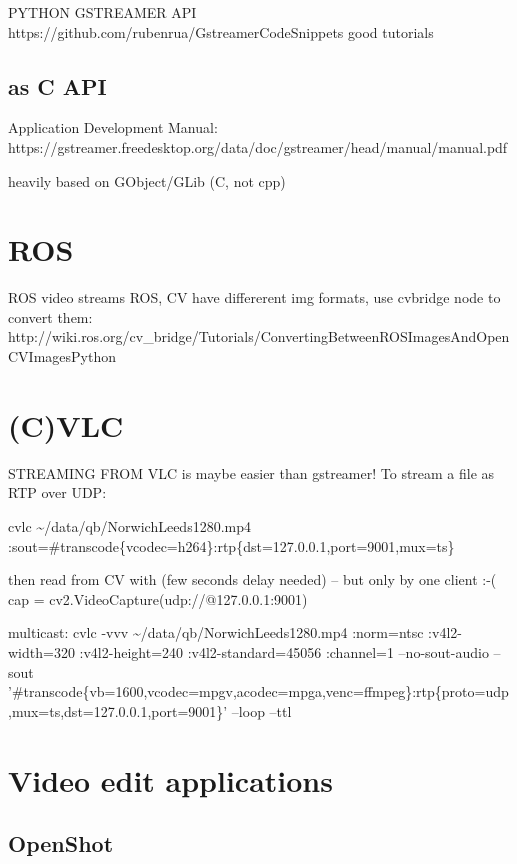 \documentclass[oneside,english]{scrbook}
\begin{document}
PYTHON GSTREAMER API https://github.com/rubenrua/GstreamerCodeSnippets
good tutorials

\section{as C API}
Application Development Manual:  https://gstreamer.freedesktop.org/data/doc/gstreamer/head/manual/manual.pdf

heavily based on GObject/GLib (C, not cpp)



\chapter{ROS}

ROS video streams ROS, CV have differerent img formats, use cvbridge
node to convert them: http://wiki.ros.org/cv\_bridge/Tutorials/ConvertingBetweenROSImagesAndOpenCVImagesPython


\chapter{(C)VLC}

STREAMING FROM VLC is maybe easier than gstreamer! To stream a file
as RTP over UDP:

cvlc \textasciitilde{}/data/qb/NorwichLeeds1280.mp4 :sout=\#transcode\{vcodec=h264\}:\textquotedbl{}rtp\{dst=127.0.0.1,port=9001,mux=ts\}\textquotedbl{}

then read from CV with (few seconds delay needed) -- but only by one
client :-( cap = cv2.VideoCapture(\textquotedbl{}udp://@127.0.0.1:9001\textquotedbl{})

multicast: cvlc -vvv \textasciitilde{}/data/qb/NorwichLeeds1280.mp4
:norm=ntsc :v4l2-width=320 :v4l2-height=240 :v4l2-standard=45056 :channel=1
--no-sout-audio --sout '\#transcode\{vb=\textquotedbl{}1600\textquotedbl{},vcodec=mpgv,acodec=mpga,venc=ffmpeg\}:rtp\{proto=udp,mux=ts,dst=127.0.0.1,port=9001\}'
--loop --ttl 

\chapter{Video edit applications}

\section{OpenShot}
\end{document}
